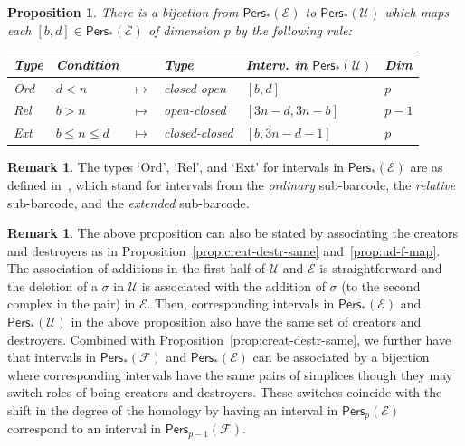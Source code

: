 \documentclass[letterpaper,11pt]{article}
\theoremstyle{mythmstyle}
\newtheorem{proposition}[theorem]{Proposition}
\theoremstyle{mydefstyle}
\newtheorem{remark}{Remark}
\theoremstyle{plain}
\newtheorem{proposition}[theorem]{Proposition}
\theoremstyle{definition}
\newtheorem{remark}[theorem]{Remark}
\newcommand{\Pers}{\mathsf{Pers}}
\newcommand{\<}[1]{\langle #1\rangle}
\newcommand{\Ecal}{\mathcal{E}}
\newcommand{\Fcal}{\mathcal{F}}
\newcommand{\Ucal}{\mathcal{U}}
\newcommand{\sG}{\sigma}
\newcommand{\Dim}{p}
\newcommand{\simpcnt}{n}
\newcommand{\ud}{\Ucal}
\newcommand{\ef}{\Ecal}
\begin{document}
\begin{proposition}\label{prop:ef-ud-map}
There is a bijection from $\Pers_*(\ef)$ to $\Pers_*(\ud)$
which maps each $[b,d]\in\Pers_*(\ef)$ of dimension $\Dim$
by the following rule{\rm:}
{\rm \begin{center}
\begin{tabular}{llclll}
\midrule
Type & Condition & & Type & Interv. in $\Pers_*(\ud)$ & Dim  \\
\midrule
Ord &
$d<\simpcnt$ & $\mapsto$ & 
  closed-open &
  $[b,d]$ &
  $\Dim$ \\ 
Rel &
$b>\simpcnt$ & $\mapsto$ & 
  open-closed &
  $[3\simpcnt-d,3\simpcnt-b]$ &
  $\Dim{-}1$ \\ 
Ext &
$b\leq\simpcnt\leq d$ & $\mapsto$ & 
  closed-closed &
  $[b,3\simpcnt-d-1]$ &
  $\Dim$ \\
\midrule
\end{tabular}
\end{center}}
\end{proposition}
\begin{remark}
The types `Ord', `Rel', and `Ext' for intervals in $\Pers_*(\ef)$
are as defined in~\cite{cohen2009extending},
which stand for intervals from the {\it ordinary} sub-barcode,
the {\it relative} sub-barcode,
and the {\it extended} sub-barcode.
\end{remark}
\begin{remark}
The above proposition can also be stated by associating the creators and destroyers
as in Proposition~\ref{prop:creat-destr-same} and~\ref{prop:ud-f-map}. The association of additions in the first half of  $\ud$ and $\ef$ 
is straightforward and the deletion of a $\sG$ in $\ud$ is associated with the addition of $\sG$ 
(to the second complex in the pair) in $\ef$.
Then, corresponding intervals in $\Pers_*(\ef)$ and $\Pers_*(\ud)$ in the above proposition 
also have the same set of creators and destroyers.
Combined with Proposition~\ref{prop:creat-destr-same},
we further have that intervals in $\Pers_*(\Fcal)$ and $\Pers_*(\ef)$ can be associated by a
bijection where corresponding intervals have the same pairs of simplices
though they may switch roles of being creators and destroyers. These switches
coincide with the shift in the degree of the homology by having an interval in
$\Pers_p(\ef)$ correspond to an interval in $\Pers_{p-1}(\Fcal)$.
\end{remark}
\end{document}
